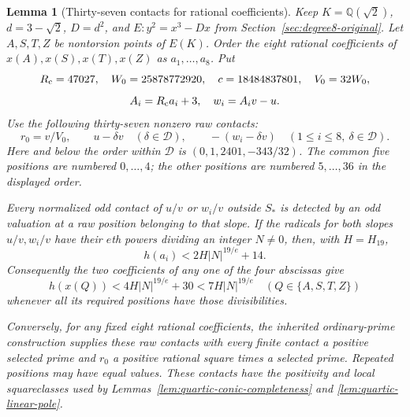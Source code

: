\documentclass[11pt]{article}
\newtheorem{lemma}[theorem]{Lemma}
\theoremstyle{definition}
\theoremstyle{remark}
\newcommand{\Q}{\mathbb Q}
\begin{document}
\begin{lemma}[Thirty-seven contacts for rational coefficients]
\label{lem:quartic-rational37}
Keep $K=\Q(\sqrt2)$, $d=3-\sqrt2$, $D=d^2$, and
$E:y^2=x^3-Dx$ from Section~\ref{sec:degree8-original}.
Let $A,S,T,Z$ be nontorsion points of $E(K)$.
Order the eight rational coefficients of
$x(A),x(S),x(T),x(Z)$ as $a_1,\ldots,a_8$. Put
\[
 R_{\rm c}=47027,\quad W_0=25878772920,\quad c=18484837801,
 \quad V_0=32W_0,
\]
\[
 A_i=R_{\rm c}a_i+3,\quad w_i=A_iv-u.
\]
Use the following thirty-seven nonzero raw contacts:
\begin{equation}\label{eq:quartic-contacts37}
 r_0=v/V_0,\qquad u-\delta v\quad(\delta\in\mathcal D),
 \qquad -(w_i-\delta v)\quad(1\le i\le8,\ \delta\in\mathcal D).
\end{equation}
Here and below the order within $\mathcal D$ is
$(0,1,2401,-343/32)$. The common five positions are numbered $0,\ldots,4$;
the other positions are numbered $5,\ldots,36$ in the displayed order.

Every normalized odd contact of $u/v$ or $w_i/v$ outside $S_*$ is
detected by an odd valuation at a raw position belonging to that slope.
If the radicals for both slopes $u/v,w_i/v$ have their $e$th powers
dividing an integer $N\ne0$, then, with $H=H_{19}$,
\[
 h(a_i)<2H|N|^{19/e}+14.
\]
Consequently the two coefficients of any one of the four abscissas give
\begin{equation}\label{eq:quartic-direct-height}
 h(x(Q))<4H|N|^{19/e}+30<7H|N|^{19/e}
 \quad(Q\in\{A,S,T,Z\})
\end{equation}
whenever all its required positions have those divisibilities.

Conversely, for any fixed eight rational coefficients, the inherited
ordinary-prime construction supplies these raw contacts with every finite
contact a positive selected prime and $r_0$ a positive rational square
times a selected prime. Repeated positions may have equal values.
These contacts have the positivity and local squareclasses used by Lemmas~\ref{lem:quartic-conic-completeness} and \ref{lem:quartic-linear-pole}.
\end{lemma}
\end{document}
